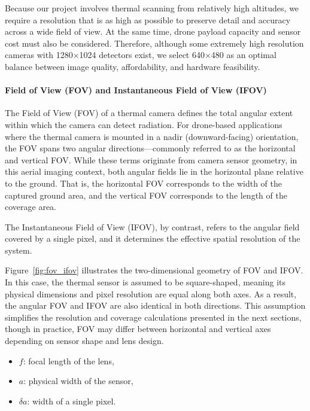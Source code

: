 Because our project involves thermal scanning from relatively high altitudes, we require a resolution that is as high as possible to preserve detail and accuracy across a wide field of view. At the same time, drone payload capacity and sensor cost must also be considered. Therefore, although some extremely high resolution cameras with 1280×1024 detectors exist, we select 640×480 as an optimal balance between image quality, affordability, and hardware feasibility.


\paragraph{Field of View (FOV) and Instantaneous Field of View (IFOV)}

The Field of View (FOV) of a thermal camera defines the total angular extent within which the camera can detect radiation. For drone-based applications where the thermal camera is mounted in a nadir (downward-facing) orientation, the FOV spans two angular directions—commonly referred to as the horizontal and vertical FOV. While these terms originate from camera sensor geometry, in this aerial imaging context, both angular fields lie in the horizontal plane relative to the ground. That is, the horizontal FOV corresponds to the width of the captured ground area, and the vertical FOV corresponds to the length of the coverage area.

The Instantaneous Field of View (IFOV), by contrast, refers to the angular field covered by a single pixel, and it determines the effective spatial resolution of the system.

Figure~\ref{fig:fov_ifov} illustrates the two-dimensional geometry of FOV and IFOV. In this case, the thermal sensor is assumed to be square-shaped, meaning its physical dimensions and pixel resolution are equal along both axes. As a result, the angular FOV and IFOV are also identical in both directions. This assumption simplifies the resolution and coverage calculations presented in the next sections, though in practice, FOV may differ between horizontal and vertical axes depending on sensor shape and lens design.


\begin{itemize}
    \item \( f \): focal length of the lens,
    \item \( a \): physical width of the sensor,
    \item \( \delta a \): width of a single pixel.
\end{itemize}

